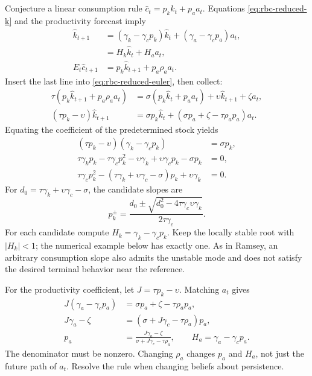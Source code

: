 Conjecture a linear consumption rule
$\hat c_t=p_k\hat k_t+p_a a_t$. Equations
\eqref{eq:rbc-reduced-k} and the productivity forecast imply
\begin{align}
\hat k_{t+1}&=(\gamma_k-\gamma_cp_k)\hat k_t
                   +(\gamma_a-\gamma_cp_a)a_t,\\
&=H_k\hat k_t+H_a a_t,\\
E_t\hat c_{t+1}&=p_k\hat k_{t+1}+p_a\rho_a a_t.
\end{align}
Insert the last line into \eqref{eq:rbc-reduced-euler}, then collect:
\begin{align}
\tau(p_k\hat k_{t+1}+p_a\rho_a a_t)
 &=\sigma(p_k\hat k_t+p_a a_t)+\upsilon\hat k_{t+1}+\zeta a_t,\\
(\tau p_k-\upsilon)\hat k_{t+1}
 &=\sigma p_k\hat k_t+(\sigma p_a+\zeta-\tau\rho_a p_a)a_t.
\end{align}
Equating the coefficient of the predetermined stock yields
\begin{align}
(\tau p_k-\upsilon)(\gamma_k-\gamma_cp_k)&=\sigma p_k,\\
\tau\gamma_kp_k-\tau\gamma_cp_k^2-\upsilon\gamma_k
 +\upsilon\gamma_cp_k-\sigma p_k&=0,\\
\tau\gamma_cp_k^2-(\tau\gamma_k+\upsilon\gamma_c-\sigma)p_k
 +\upsilon\gamma_k&=0.
\end{align}
For $d_0=\tau\gamma_k+\upsilon\gamma_c-\sigma$, the candidate slopes are
\begin{equation}
p_k^{\pm}=\frac{d_0\pm\sqrt{d_0^2-4\tau\gamma_c\upsilon\gamma_k}}
                    {2\tau\gamma_c}.
\end{equation}
For each candidate compute $H_k=\gamma_k-\gamma_cp_k$. Keep the locally stable
root with $|H_k|<1$; the numerical example below has exactly one. As in Ramsey,
an arbitrary consumption slope also admits the unstable mode and does not
satisfy the desired terminal behavior near the reference.

For the productivity coefficient, let $J=\tau p_k-\upsilon$. Matching $a_t$ gives
\begin{align}
J(\gamma_a-\gamma_cp_a)&=\sigma p_a+\zeta-\tau\rho_a p_a,\\
J\gamma_a-\zeta&=(\sigma+J\gamma_c-\tau\rho_a)p_a,\\
p_a&=\frac{J\gamma_a-\zeta}{\sigma+J\gamma_c-\tau\rho_a},\qquad
H_a=\gamma_a-\gamma_cp_a.\label{eq:rbc-policy-a}
\end{align}
The denominator must be nonzero. Changing $\rho_a$ changes $p_a$ and $H_a$,
not just the future path of $a_t$. Resolve the rule when changing beliefs
about persistence.

